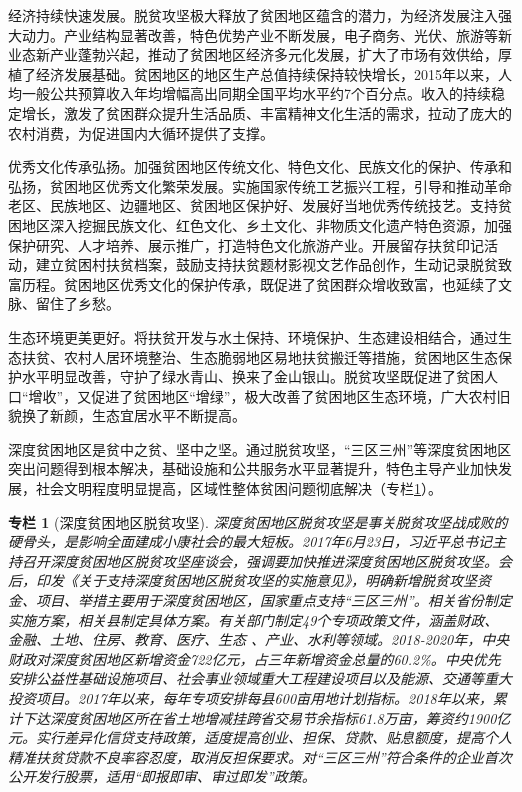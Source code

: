 \documentclass{ctexart}
\newtheorem{zhuanlan}{专栏}
\begin{document}
经济持续快速发展。脱贫攻坚极大释放了贫困地区蕴含的潜力，为经济发展注入强大动力。产业结构显著改善，特色优势产业不断发展，电子商务、光伏、旅游等新业态新产业蓬勃兴起，推动了贫困地区经济多元化发展，扩大了市场有效供给，厚植了经济发展基础。贫困地区的地区生产总值持续保持较快增长，2015年以来，人均一般公共预算收入年均增幅高出同期全国平均水平约7个百分点。收入的持续稳定增长，激发了贫困群众提升生活品质、丰富精神文化生活的需求，拉动了庞大的农村消费，为促进国内大循环提供了支撑。

优秀文化传承弘扬。加强贫困地区传统文化、特色文化、民族文化的保护、传承和弘扬，贫困地区优秀文化繁荣发展。实施国家传统工艺振兴工程，引导和推动革命老区、民族地区、边疆地区、贫困地区保护好、发展好当地优秀传统技艺。支持贫困地区深入挖掘民族文化、红色文化、乡土文化、非物质文化遗产特色资源，加强保护研究、人才培养、展示推广，打造特色文化旅游产业。开展留存扶贫印记活动，建立贫困村扶贫档案，鼓励支持扶贫题材影视文艺作品创作，生动记录脱贫致富历程。贫困地区优秀文化的保护传承，既促进了贫困群众增收致富，也延续了文脉、留住了乡愁。

生态环境更美更好。将扶贫开发与水土保持、环境保护、生态建设相结合，通过生态扶贫、农村人居环境整治、生态脆弱地区易地扶贫搬迁等措施，贫困地区生态保护水平明显改善，守护了绿水青山、换来了金山银山。脱贫攻坚既促进了贫困人口“增收”，又促进了贫困地区“增绿”，极大改善了贫困地区生态环境，广大农村旧貌换了新颜，生态宜居水平不断提高。

深度贫困地区是贫中之贫、坚中之坚。通过脱贫攻坚，“三区三州”等深度贫困地区突出问题得到根本解决，基础设施和公共服务水平显著提升，特色主导产业加快发展，社会文明程度明显提高，区域性整体贫困问题彻底解决（专栏\ref{col-4}）。

\begin{zhuanlan}[深度贫困地区脱贫攻坚]
    深度贫困地区脱贫攻坚是事关脱贫攻坚战成败的硬骨头，是影响全面建成小康社会的最大短板。2017年6月23日，习近平总书记主持召开深度贫困地区脱贫攻坚座谈会，强调要加快推进深度贫困地区脱贫攻坚。会后，印发《关于支持深度贫困地区脱贫攻坚的实施意见》，明确新增脱贫攻坚资金、项目、举措主要用于深度贫困地区，国家重点支持“三区三州”。相关省份制定实施方案，相关县制定具体方案。有关部门制定49个专项政策文件，涵盖财政、金融、土地、住房、教育、医疗、生态 、产业、水利等领域。2018-2020年，中央财政对深度贫困地区新增资金722亿元，占三年新增资金总量的60.2\%。中央优先安排公益性基础设施项目、社会事业领域重大工程建设项目以及能源、交通等重大投资项目。2017年以来，每年专项安排每县600亩用地计划指标。2018年以来，累计下达深度贫困地区所在省土地增减挂跨省交易节余指标61.8万亩，筹资约1900亿元。实行差异化信贷支持政策，适度提高创业、担保、贷款、贴息额度，提高个人精准扶贫贷款不良率容忍度，取消反担保要求。对“三区三州”符合条件的企业首次公开发行股票，适用“即报即审、审过即发”政策。
    \label{col-4}
\end{zhuanlan}
\end{document}
